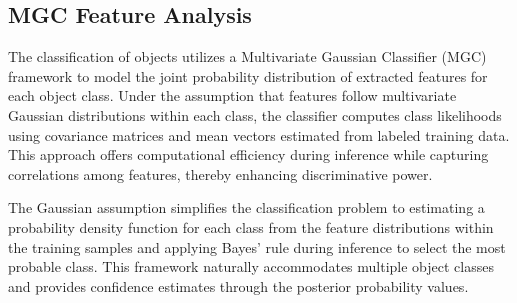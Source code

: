 \documentclass{erauthesis}
\begin{document}
\subsection{MGC Feature Analysis} \label{features_gbcache}


The classification of objects utilizes a Multivariate Gaussian Classifier (MGC) framework to model the joint probability distribution of extracted features for each object class. 
Under the assumption that features follow multivariate Gaussian distributions within each class, the classifier computes class likelihoods using covariance matrices and mean vectors estimated from labeled training data. 
This approach offers computational efficiency during inference while capturing correlations among features, thereby enhancing discriminative power.

The Gaussian assumption simplifies the classification problem to estimating a probability density function for each class from the feature distributions within the training samples and applying Bayes' rule during inference to select the most probable class.
This framework naturally accommodates multiple object classes and provides confidence estimates through the posterior probability values.
\end{document}
